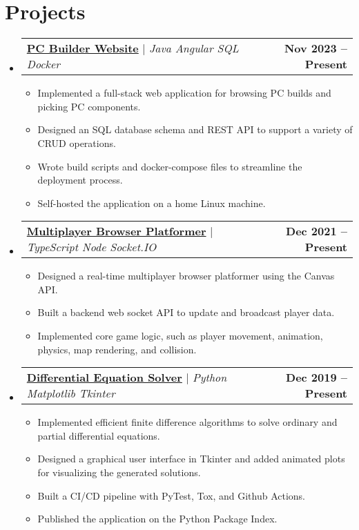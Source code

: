 \documentclass[letterpaper,11pt]{article}
\makeatletter
\newcommand{\resumeItem}[1]{
  \item\small{
    {#1 \vspace{-2pt}}
  }
}
\newcommand{\resumeProjectHeading}[2]{
    \item
    \begin{tabular*}{1.001\textwidth}{l@{\extracolsep{\fill}}r}
      \small#1 & \textbf{\small #2}\\
    \end{tabular*}\vspace{-7pt}
}
\newcommand{\resumeSubHeadingListStart}{\begin{itemize}[leftmargin=0.0in, label={}]}
\newcommand{\resumeSubHeadingListEnd}{\end{itemize}}
\newcommand{\resumeItemListStart}{\begin{itemize}}
\newcommand{\resumeItemListEnd}{\end{itemize}\vspace{-5pt}}
\makeatother
\begin{document}
\section{Projects}
    \vspace{-5pt}
    \resumeSubHeadingListStart
      \resumeProjectHeading
          {\href{https://github.com/joeyshi12/pc-builder}{\textbf{PC Builder Website}} $|$ \emph{Java \textperiodcentered{} Angular \textperiodcentered{} SQL \textperiodcentered{} Docker}}{Nov 2023 -- Present}
          \resumeItemListStart
            \resumeItem{Implemented a full-stack web application for browsing PC builds and picking PC components.}
            \resumeItem{Designed an SQL database schema and REST API to support a variety of CRUD operations.}
            \resumeItem{Wrote build scripts and docker-compose files to streamline the deployment process.}
            \resumeItem{Self-hosted the application on a home Linux machine.}
          \resumeItemListEnd
          \vspace{-13pt}
      \resumeProjectHeading
          {\href{https://github.com/joeyshi12/joeys-games}{\textbf{Multiplayer Browser Platformer}} $|$ \emph{TypeScript \textperiodcentered{} Node \textperiodcentered{} Socket.IO}}{Dec 2021 -- Present}
          \resumeItemListStart
            \resumeItem{Designed a real-time multiplayer browser platformer using the Canvas API.}
            \resumeItem{Built a backend web socket API to update and broadcast player data.}
            \resumeItem{Implemented core game logic, such as player movement, animation, physics, map rendering, and collision.}
          \resumeItemListEnd
          \vspace{-13pt}
      \resumeProjectHeading
          {\href{https://github.com/joeyshi12/diff-eq-solver}{\textbf{Differential Equation Solver}} $|$ \emph{Python \textperiodcentered{} Matplotlib \textperiodcentered{} Tkinter}}{Dec 2019 -- Present}
          \resumeItemListStart
            \resumeItem{Implemented efficient finite difference algorithms to solve ordinary and partial differential equations.}
            \resumeItem{Designed a graphical user interface in Tkinter and added animated plots for visualizing the generated solutions.}
            \resumeItem{Built a CI/CD pipeline with PyTest, Tox, and Github Actions.}
            \resumeItem{Published the application on the Python Package Index.}
          \resumeItemListEnd
    \resumeSubHeadingListEnd
\vspace{-15pt}

\end{document}
